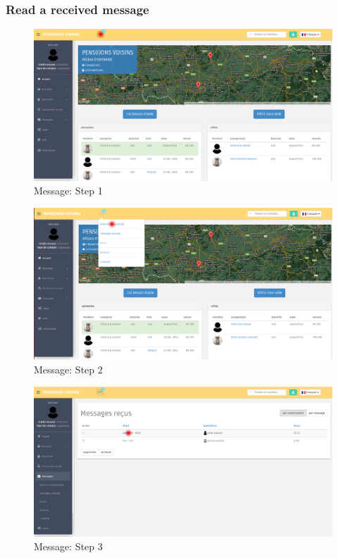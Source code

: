 \documentclass{article}
\begin{document}
\subsubsection{Read a received message}
\begin{figure}[!ht]
   \includegraphics[width=\textwidth]{img/mess1.png}
   \caption{Message: Step 1}
\end{figure}
\begin{figure}[!ht]
   \includegraphics[width=\textwidth]{img/mess2.png}
   \caption{Message: Step 2}
\end{figure}
\begin{figure}[!ht]
   \includegraphics[width=\textwidth]{img/mess3.png}
   \caption{Message: Step 3}
\end{figure}
\end{document}
